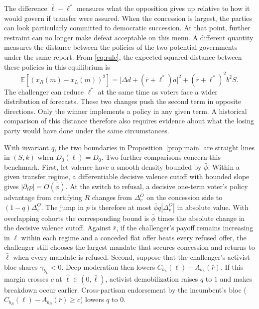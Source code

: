 \documentclass[11pt,letterpaper]{article}
\newcommand{\E}{\mathbb E}
\newcommand{\Dd}{\Delta d}
\begin{document}
The difference $\bar\ell-\ell^*$ measures what the opposition gives up relative to how it would govern if transfer were assured. When the concession is largest, the parties can look particularly committed to democratic succession. At that point, further restraint can no longer make defeat acceptable on this menu. A different quantity measures the distance between the policies of the two potential governments under the same report. From \eqref{eq:rule}, the expected squared distance between these policies in this equilibrium is
\begin{equation}
 \E\!\left[(x_R(m)-x_L(m))^2\right]
 =\big[\Dd+(\bar r+\ell^*)a\big]^2+(\bar r+\ell^*)^2 b^2 S .
 \label{eq:mandatedistance}
\end{equation}
The challenger can reduce $\ell^*$ at the same time as voters face a wider distribution of forecasts. These two changes push the second term in opposite directions. Only the winner implements a policy in any given term. A historical comparison of this distance therefore also requires evidence about what the losing party would have done under the same circumstances.

With invariant $q$, the two boundaries in Proposition~\ref{prop:main} are straight lines in $(S,k)$ when $D_0(\ell)=D_0$. Two further comparisons concern this benchmark. First, let valence have a smooth density bounded by $\bar\phi$. Within a given transfer regime, a differentiable decisive valence cutoff with bounded slope gives $|\partial_\ell p|=O(\bar\phi)$. At the switch to refusal, a decisive one-term voter's policy advantage from certifying $R$ changes from $\Delta_v^O$ on the concession side to $(1-q)\Delta_v^O$. The jump in $p$ is therefore at most $\bar\phi q|\Delta_v^O|$ in absolute value. With overlapping cohorts the corresponding bound is $\bar\phi$ times the absolute change in the decisive valence cutoff. Against $\bar r$, if the challenger's payoff remains increasing in $\ell$ within each regime and a conceded flat offer beats every refused offer, the challenger still chooses the largest mandate that secures concession and returns to $\bar\ell$ when every mandate is refused. Second, suppose that the challenger's activist bloc shares $\gamma_{b_L}<0$. Deep moderation then lowers $C_{b_L}(\ell)-A_{b_L}(\bar r)$. If this margin crosses $c$ at $\hat\ell\in(0,\bar\ell)$, activist demobilization raises $q$ to $1$ and makes breakdown occur earlier. Cross-partisan endorsement by the incumbent's bloc ($C_{b_R}(\ell)-A_{b_R}(\bar r)\ge c$) lowers $q$ to $0$.
\end{document}
